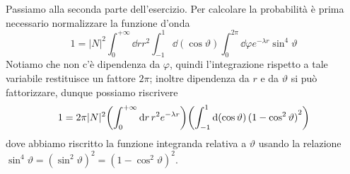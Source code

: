 \begin{soluzione}
   \vspace{0.2cm}Passiamo alla seconda parte dell'esercizio. Per calcolare la probabilità è prima necessario normalizzare la funzione d'onda
   \begin{equation*}
      1
      =|N|^2 \int_{0}^{+\infty} \dd{r} r^2 \int_{-1}^{1} \dd{(\cos{\vartheta})} \int_{0}^{2\pi} \dd{\varphi} e^{-\lambda r} \sin^4{\vartheta}
   \end{equation*}
   Notiamo che non c'è dipendenza da $\varphi$, quindi l'integrazione rispetto a tale variabile restituisce un fattore $2\pi$; inoltre dipendenza da $r$ e da $\vartheta$ si può fattorizzare, dunque possiamo riscrivere
   \begin{equation*}
      1
      =2\pi |N|^2 \qty( \int_{0}^{+\infty} \dd{r} r^2 e^{-\lambda r} ) \qty( \int_{-1}^{1} \dd{(\cos{\vartheta})} {(1 - \cos^2{\vartheta} )}^2 )
   \end{equation*}
   dove abbiamo riscritto la funzione integranda relativa a $\vartheta$ usando la relazione $\sin^4{\vartheta}={(\sin^2{\vartheta})}^2={(1 - \cos^2{\vartheta} )}^2$.


\end{soluzione}
